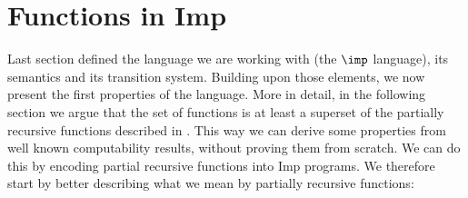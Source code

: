 \section{Functions in Imp}\label{sec:functionsimp}
Last section defined the language we are working with (the \(\imp\)
language), its semantics and its transition system. Building upon
those elements, we now present the first properties of the
language. More in detail, in the following section we argue that the
set of functions is at least a superset of the partially recursive
functions described in \cite{cutland1980computability}. This way we
can derive some properties from well known computability results,
without proving them from scratch. We can do this by encoding partial
recursive functions into Imp programs.  We therefore start by better
describing what we mean by partially recursive functions:
